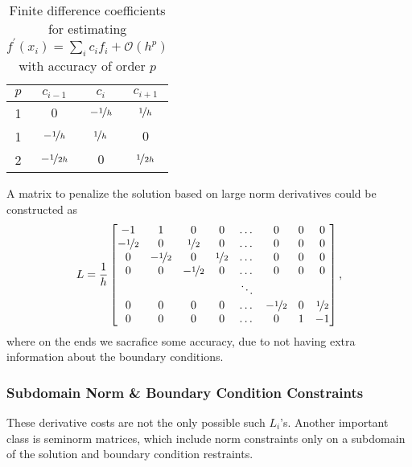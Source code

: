 \documentclass{article}
\begin{document}
	\begin{table}[h!]
		\centering
		\begin{tabular}{|c|c|c|c|}
			\hline
			$p$ & $c_{i-1}$ & $c_{i}$ & $c_{i+1}$\\\hline\hline
			1 & $0$ & $-\nicefrac{1}{h}$ & $\nicefrac{1}{h}$ \\\hline
			1 & $-\nicefrac{1}{h}$ & $\nicefrac{1}{h}$ & $0$ \\\hline
			2 & $-\nicefrac{1}{2h}$  & $0$ & $\nicefrac{1}{2h}$ \\\hline
		\end{tabular}
		\caption{Finite difference coefficients for estimating $f^\prime(x_i) = \sum_i c_i f_i + \mathcal{O}\left(h^p\right)$ with accuracy of order $p$}\label{table:finite-diff}
	\end{table}
	
	A matrix to penalize the solution based on large norm derivatives could be constructed as 
	\begin{equation}
		L = \frac{1}{h}\begin{bmatrix}
			-1 & 1 & 0 & 0 &\dots & 0 & 0 & 0 \\
			 -\nicefrac{1}{2} & 0 & \nicefrac{1}{2} & 0 &\dots & 0  & 0 & 0 \\
			 0 & -\nicefrac{1}{2} & 0 & \nicefrac{1}{2} &\dots & 0 & 0 & 0 \\
			0& 0 & -\nicefrac{1}{2} & 0 &\dots & 0 & 0 & 0 \\
			& & & & \ddots & & \\
			0 & 0 & 0 & 0 &\dots & -\nicefrac{1}{2} & 0 & \nicefrac{1}{2} \\
			0 & 0 & 0 & 0 &\dots & 0 & 1 & -1 \\
		\end{bmatrix},
	\end{equation}
	where on the ends we sacrafice some accuracy, due to not having extra information about the boundary conditions.
	
	\subsubsection*{Subdomain Norm \& Boundary Condition Constraints}
	These derivative costs are not the only possible such $L_i$'s. Another important class is seminorm matrices, which include norm constraints only on a subdomain of the solution and boundary condition restraints.
	
\end{document}
